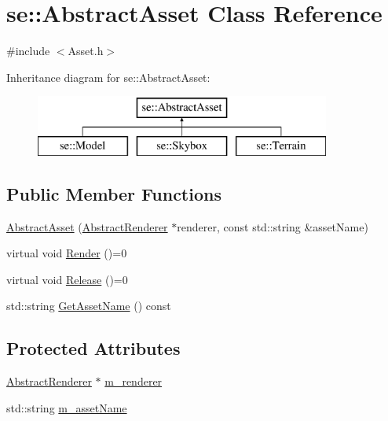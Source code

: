 \hypertarget{classse_1_1_abstract_asset}{}\section{se\+:\+:Abstract\+Asset Class Reference}
\label{classse_1_1_abstract_asset}


{\ttfamily \#include $<$Asset.\+h$>$}

Inheritance diagram for se\+:\+:Abstract\+Asset\+:\begin{figure}[H]
\begin{center}
\leavevmode
\includegraphics[height=2.000000cm]{classse_1_1_abstract_asset}
\end{center}
\end{figure}
\subsection*{Public Member Functions}
\begin{DoxyCompactItemize}
\item 
\mbox{\hyperlink{classse_1_1_abstract_asset_acb27e3d7a54233b28ce430a67448506a}{Abstract\+Asset}} (\mbox{\hyperlink{classse_1_1_abstract_renderer}{Abstract\+Renderer}} $\ast$renderer, const std\+::string \&asset\+Name)
\item 
virtual void \mbox{\hyperlink{classse_1_1_abstract_asset_a2addad2ca18a3ffbcbe1e80afa0ad56c}{Render}} ()=0
\item 
virtual void \mbox{\hyperlink{classse_1_1_abstract_asset_aea97e36f647efdb07a801b6fc468388d}{Release}} ()=0
\item 
std\+::string \mbox{\hyperlink{classse_1_1_abstract_asset_aae608bfd21c9b7a8370b0a7e37e7349c}{Get\+Asset\+Name}} () const
\end{DoxyCompactItemize}
\subsection*{Protected Attributes}
\begin{DoxyCompactItemize}
\item 
\mbox{\hyperlink{classse_1_1_abstract_renderer}{Abstract\+Renderer}} $\ast$ \mbox{\hyperlink{classse_1_1_abstract_asset_a9f151d3b1c32c1f244f1b4569e67956c}{m\+\_\+renderer}}
\item 
std\+::string \mbox{\hyperlink{classse_1_1_abstract_asset_af2a5f8455bda2db6577864b79d4246d1}{m\+\_\+asset\+Name}}
\end{DoxyCompactItemize}


